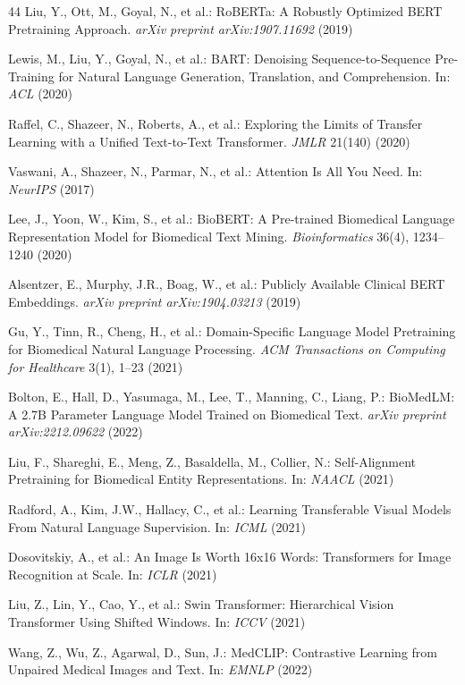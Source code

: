 \documentclass[9pt]{report}
\begin{document}
\begin{thebibliography}{44}
Liu, Y., Ott, M., Goyal, N., et al.: RoBERTa: A Robustly Optimized BERT Pretraining Approach. \textit{arXiv preprint arXiv:1907.11692} (2019)

Lewis, M., Liu, Y., Goyal, N., et al.: BART: Denoising Sequence-to-Sequence Pre-Training for Natural Language Generation, Translation, and Comprehension. In: \textit{ACL} (2020)

Raffel, C., Shazeer, N., Roberts, A., et al.: Exploring the Limits of Transfer Learning with a Unified Text-to-Text Transformer. \textit{JMLR} 21(140) (2020)

Vaswani, A., Shazeer, N., Parmar, N., et al.: Attention Is All You Need. In: \textit{NeurIPS} (2017)

Lee, J., Yoon, W., Kim, S., et al.: BioBERT: A Pre-trained Biomedical Language Representation Model for Biomedical Text Mining. \textit{Bioinformatics} 36(4), 1234--1240 (2020)

Alsentzer, E., Murphy, J.R., Boag, W., et al.: Publicly Available Clinical BERT Embeddings. \textit{arXiv preprint arXiv:1904.03213} (2019)

Gu, Y., Tinn, R., Cheng, H., et al.: Domain-Specific Language Model Pretraining for Biomedical Natural Language Processing. \textit{ACM Transactions on Computing for Healthcare} 3(1), 1--23 (2021)

Bolton, E., Hall, D., Yasumaga, M., Lee, T., Manning, C., Liang, P.: BioMedLM: A 2.7B Parameter Language Model Trained on Biomedical Text. \textit{arXiv preprint arXiv:2212.09622} (2022)

Liu, F., Shareghi, E., Meng, Z., Basaldella, M., Collier, N.: Self-Alignment Pretraining for Biomedical Entity Representations. In: \textit{NAACL} (2021)

Radford, A., Kim, J.W., Hallacy, C., et al.: Learning Transferable Visual Models From Natural Language Supervision. In: \textit{ICML} (2021)

Dosovitskiy, A., et al.: An Image Is Worth 16x16 Words: Transformers for Image Recognition at Scale. In: \textit{ICLR} (2021)

Liu, Z., Lin, Y., Cao, Y., et al.: Swin Transformer: Hierarchical Vision Transformer Using Shifted Windows. In: \textit{ICCV} (2021)

Wang, Z., Wu, Z., Agarwal, D., Sun, J.: MedCLIP: Contrastive Learning from Unpaired Medical Images and Text. In: \textit{EMNLP} (2022)


\end{thebibliography}
\end{document}
